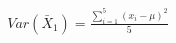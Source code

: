 \documentclass[preview]{standalone}
\begin{document}
\begin{align*}
Var(\bar{X}_1) = \frac{\sum_{i=1}^{5}(x_i - \mu)^2}{5}
\end{align*}
\end{document}
